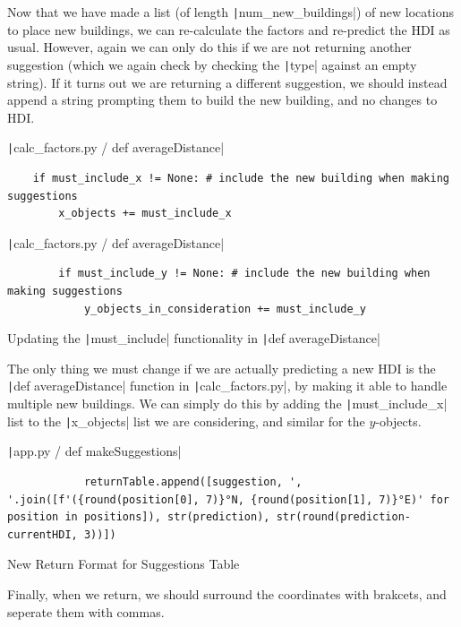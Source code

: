 \documentclass[12pt]{report}
\newcommand{\pil}[1]{\protect\texttt|#1|}
\begin{document}
Now that we have made a list (of length \pil{num_new_buildings}) of new locations to place new buildings, we can re-calculate the factors and re-predict the HDI as usual. However, again we can only do this if we are not returning another suggestion (which we again check by checking the \pil{type} against an empty string). If it turns out we are returning a different suggestion, we should instead append a string prompting them to build the new building, and no changes to HDI.

\begin{listing}[H]
\pil{calc_factors.py / def averageDistance}
\begin{verbatim}
    if must_include_x != None: # include the new building when making suggestions
        x_objects += must_include_x
\end{verbatim}
\pil{calc_factors.py / def averageDistance}
\begin{verbatim}
        if must_include_y != None: # include the new building when making suggestions
            y_objects_in_consideration += must_include_y
\end{verbatim}
\caption{Updating the \pil{must_include} functionality in \pil{def averageDistance}}\label{cs:ensureIncludeAllNewObjects}
\end{listing}

The only thing we must change if we are actually predicting a new HDI is the \pil{def averageDistance} function in \pil{calc_factors.py}, by making it able to handle multiple new buildings. We can simply do this by adding the \pil{must_include_x} list to the \pil{x_objects} list we are considering, and similar for the $y$-objects.

\begin{listing}[H]
\pil{app.py / def makeSuggestions}
\begin{verbatim}
            returnTable.append([suggestion, ', '.join([f'({round(position[0], 7)}°N, {round(position[1], 7)}°E)' for position in positions]), str(prediction), str(round(prediction-currentHDI, 3))])
\end{verbatim}
\caption{New Return Format for Suggestions Table}\label{cs:returnFormatSuggestionsTable}
\end{listing}

Finally, when we return, we should surround the coordinates with brakcets, and seperate them with commas.
\end{document}
